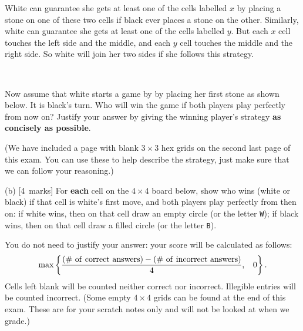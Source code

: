 \documentclass[12pt]{article}
\newcommand{\mymarks}[1]{\mbox{\small [#1 marks]}}
\begin{document}
White can guarantee she gets at least one of the cells labelled $x$ 
by placing a stone on one of these two cells
if black ever places a stone on the other. 
Similarly, white can guarantee she gets at least one of the cells 
labelled $y$.
But each $x$ cell touches the left side and the middle,
and each $y$ cell touches the middle and the right side.
So white will join her two sides if she follows this strategy.

~

Now assume that white starts a game by
by placing her first stone as shown below. 
It is black's turn. 
Who will win the game if both players play perfectly from now on?
Justify your answer by giving the winning player's strategy 
{\bf as concisely as possible}. 

(We have included a page with blank $3 \times 3$ hex grids
on the second last page of this exam. You can use these to help describe the strategy, just make sure that we can follow your reasoning.)

\newpage
(b) \mymarks{4}
For {\bf each} cell on the $4 \times 4$ board below, 
show who wins (white or black) if that cell is white's first move,
and both players play perfectly from then on:
if white wins, then on that cell draw an empty circle
(or the letter \texttt{W}); 
if black wins, then on that cell draw a filled circle 
(or the letter \texttt{B}).

You do not need to justify your answer:
your score will be calculated as follows:
\[ \max\left\{\frac{({\rm \#~of~correct~answers}) - ({\rm \#~of~incorrect~answers})}{4}, \:\:\:\: 0\right\}. \]
Cells left blank will be counted neither correct nor incorrect.
Illegible entries will be counted incorrect.
(Some empty $4 \times 4$ grids can be found at the end of this exam. These are for your scratch notes only and will not be looked at when we grade.)

~

\end{document}
